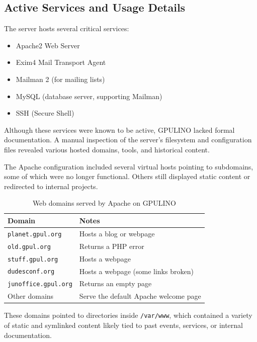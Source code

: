 \subsection{Active Services and Usage Details}

The server hosts several critical services:
\begin{itemize}
    \item Apache2 Web Server
    \item Exim4 Mail Transport Agent
    \item Mailman 2 (for mailing lists)
    \item MySQL (database server, supporting Mailman)
    \item SSH (Secure Shell)
\end{itemize}

Although these services were known to be active, GPULINO lacked formal documentation. A manual inspection of the server's filesystem and configuration files revealed various hosted domains, tools, and historical content.

The Apache configuration included several virtual hosts pointing to subdomains, some of which were no longer functional. Others still displayed static content or redirected to internal projects.

\begin{table}[H]
  \centering
  \caption{Web domains served by Apache on GPULINO}
  \label{tab:gpulino_apache_domains}
  \begin{tabular}{ll}
    \rowcolor{udcpink!25}
    \textbf{Domain} & \textbf{Notes} \\
    \hline
    \texttt{planet.gpul.org} & Hosts a blog or webpage \\
    \texttt{old.gpul.org} & Returns a PHP error \\
    \texttt{stuff.gpul.org} & Hosts a webpage \\
    \texttt{dudesconf.org} & Hosts a webpage (some links broken) \\
    \texttt{junoffice.gpul.org} & Returns an empty page \\
    Other domains & Serve the default Apache welcome page \\
  \end{tabular}
\end{table}

These domains pointed to directories inside \texttt{/var/www}, which contained a variety of static and symlinked content likely tied to past events, services, or internal documentation.

